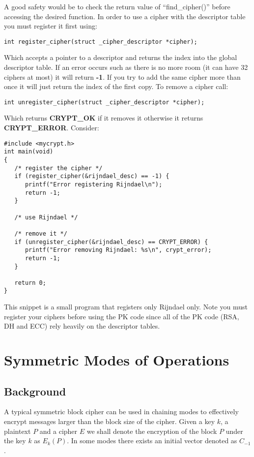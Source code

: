 \documentclass{book}
\begin{document}
A good safety would be to check the return value of ``find\_cipher()'' before accessing the desired function.  In order
to use a cipher with the descriptor table you must register it first using:
\begin{verbatim}
int register_cipher(struct _cipher_descriptor *cipher);
\end{verbatim}
Which accepts a pointer to a descriptor and returns the index into the global descriptor table.  If an error occurs such
as there is no more room (it can have 32 ciphers at most) it will return {\bf{-1}}.  If you try to add the same cipher more
than once it will just return the index of the first copy.  To remove a cipher call:
\begin{verbatim}
int unregister_cipher(struct _cipher_descriptor *cipher);
\end{verbatim}
Which returns {\bf CRYPT\_OK} if it removes it otherwise it returns {\bf CRYPT\_ERROR}.  Consider:
\begin{small}
\begin{verbatim}
#include <mycrypt.h>
int main(void)
{
   /* register the cipher */
   if (register_cipher(&rijndael_desc) == -1) {
      printf("Error registering Rijndael\n");
      return -1;
   }

   /* use Rijndael */

   /* remove it */
   if (unregister_cipher(&rijndael_desc) == CRYPT_ERROR) {
      printf("Error removing Rijndael: %s\n", crypt_error);
      return -1;
   }

   return 0;
}
\end{verbatim}
\end{small}
This snippet is a small program that registers only Rijndael only.  Note you must register your ciphers before
using the PK code since all of the PK code (RSA, DH and ECC) rely heavily on the descriptor tables.

\section{Symmetric Modes of Operations}
\subsection{Background}
A typical symmetric block cipher can be used in chaining modes to effectively encrypt messages larger than the block
size of the cipher.  Given a key $k$, a plaintext $P$ and a cipher $E$ we shall denote the encryption of the block
$P$ under the key $k$ as $E_k(P)$.  In some modes there exists an initial vector denoted as $C_{-1}$.
\end{document}
